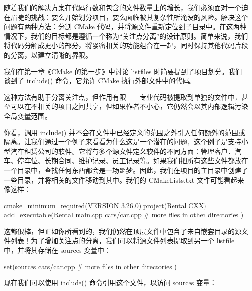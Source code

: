 随着我们的解决方案在代码行数和包含的文件数量上的增长，我们必须面对一个迫在眉睫的挑战：要么开始划分项目，要么面临被其复杂性所淹没的风险。解决这个问题有两种方法：分割 CMake 代码，并将源文件重新定位到子目录中。在这两种情况下，我们的目标都是遵循一个称为“关注点分离”的设计原则。简单来说，我们将代码分解成更小的部分，将紧密相关的功能组合在一起，同时保持其他代码片段的分离，以建立清晰的界限。

我们在第一章《CMake 的第一步》中讨论 listfiles 时简要提到了项目划分。我们谈到了 include() 命令，它允许 CMake 执行外部文件中的代码。

这种方法有助于分离关注点，但作用有限——专业代码被提取到单独的文件中，甚至可以在不相关的项目之间共享，但如果作者不小心，它仍然会以其内部逻辑污染全局变量范围。

你看，调用 include() 并不会在文件中已经定义的范围之外引入任何额外的范围或隔离。让我们通过一个例子来看看为什么这是一个潜在的问题，这个例子是支持小型汽车租赁公司的软件。它将有多个源文件定义软件的不同方面：管理客户、汽车、停车位、长期合同、维护记录、员工记录等。如果我们把所有这些文件都放在一个目录中，查找任何东西都会是一场噩梦。因此，我们在项目的主目录中创建了一些目录，并将相关的文件移动到其中。我们的 CMakeLists.txt 文件可能看起来像这样：


\begin{cmake}
cmake_minimum_required(VERSION 3.26.0)
project(Rental CXX)
add_executable(Rental
               main.cpp
               cars/car.cpp
               # more files in other directories
)
\end{cmake}

这都很棒，但正如你所看到的，我们仍然在顶层文件中包含了来自嵌套目录的源文件列表！为了增加关注点的分离，我们可以将源文件列表提取到另一个 listfile 中，并将其存储在 sources 变量中：


\begin{cmake}
set(sources
    cars/car.cpp
    # more files in other directories
)
\end{cmake}

现在我们可以使用 include() 命令引用这个文件，以访问 sources 变量：



